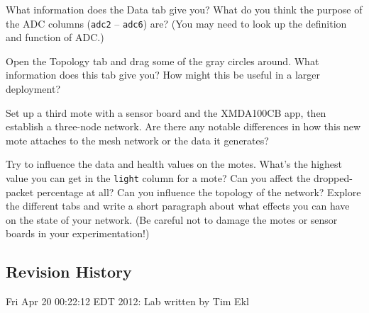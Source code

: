 \documentclass{article}
\begin{document}
 What information does the Data tab give you? What do you think the purpose of the ADC columns (\verb!adc2! -- \verb!adc6!) are? (You may need to look up the definition and function of ADC.)

 Open the Topology tab and drag some of the gray circles around. What information does this tab give you? How might this be useful in a larger deployment?

 Set up a third mote with a sensor board and the XMDA100CB app, then establish a three-node network. Are there any notable differences in how this new mote attaches to the mesh network or the data it generates?

 Try to influence the data and health values on the motes. What's the highest value you can get in the \verb!light! column for a mote? Can you affect the dropped-packet percentage at all? Can you influence the topology of the network? Explore the different tabs and write a short paragraph about what effects you can have on the state of your network. (Be careful not to damage the motes or sensor boards in your experimentation!)



\subsection*{Revision History}
\begin{itemize*}
 \item Fri Apr 20 00:22:12 EDT 2012: Lab written by Tim Ekl
\end{itemize*}
\end{document}
